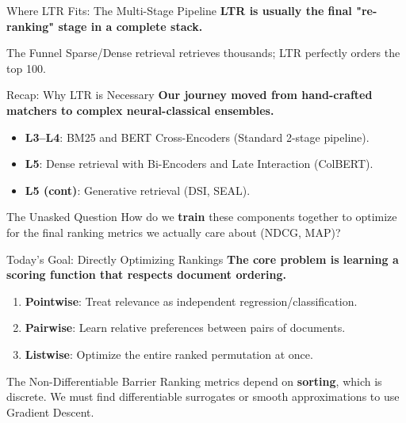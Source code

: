 \documentclass[aspectratio=169]{beamer}
\newif\ifanimated
\newcommand{\cpause}{\ifanimated\pause\fi}
\begin{document}
\begin{frame}{Where LTR Fits: The Multi-Stage Pipeline}
\textbf{LTR is usually the final "re-ranking" stage in a complete stack.}

\vspace{0.5em}
\begin{center}
\resizebox{0.85\textwidth}{!}{

}
\end{center}

\cpause
\vspace{0.5em}
\begin{exampleblock}{The Funnel}
Sparse/Dense retrieval retrieves thousands; LTR perfectly orders the top 100.
\end{exampleblock}
\end{frame}

\begin{frame}{Recap: Why LTR is Necessary}
\textbf{Our journey moved from hand-crafted matchers to complex neural-classical ensembles.}

\vspace{0.8em}
\begin{itemize}
    \item \textbf{L3--L4}: BM25 and BERT Cross-Encoders (Standard 2-stage pipeline).
    \item \textbf{L5}: Dense retrieval with Bi-Encoders and Late Interaction (ColBERT).
    \item \textbf{L5 (cont)}: Generative retrieval (DSI, SEAL).
\end{itemize}\cpause

\vspace{1em}
\cpause
\begin{block}{The Unasked Question}
How do we \textbf{train} these components together to optimize for the final ranking metrics we actually care about (NDCG, MAP)?
\end{block}
\end{frame}

\begin{frame}{Today's Goal: Directly Optimizing Rankings}
\textbf{The core problem is learning a scoring function that respects document ordering.}

\vspace{0.8em}
\begin{enumerate}
    \item \textbf{Pointwise}: Treat relevance as independent regression/classification.
    \item \textbf{Pairwise}: Learn relative preferences between pairs of documents.
    \item \textbf{Listwise}: Optimize the entire ranked permutation at once.
\end{enumerate}

\vspace{1em}
\cpause
\begin{block}{The Non-Differentiable Barrier}
Ranking metrics depend on \textbf{sorting}, which is discrete. We must find differentiable surrogates or smooth approximations to use Gradient Descent.
\end{block}
\end{frame}
\end{document}
